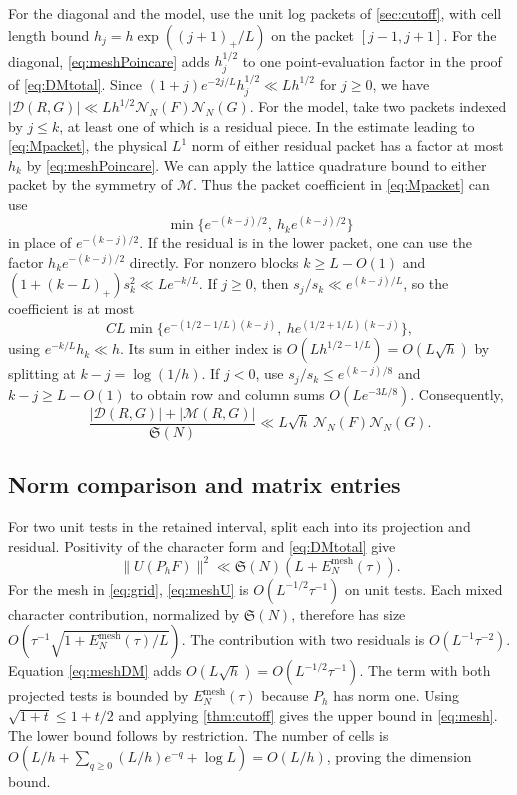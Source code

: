\documentclass[11pt,a4paper]{article}
\numberwithin{equation}{section}
\newcommand{\SSS}{\mathfrak S}
\newcommand{\NN}{\mathcal N_N}
\begin{document}
For the diagonal and the model, use the unit log packets of
\cref{sec:cutoff}, with cell length bound $h_j=h\exp((j+1)_+/L)$
on the packet $[j-1,j+1]$. For the diagonal,
\cref{eq:meshPoincare} adds $h_j^{1/2}$ to one
point-evaluation factor in the proof of \cref{eq:DMtotal}. Since
$(1+j)e^{-2j/L}h_j^{1/2}\ll Lh^{1/2}$ for $j\ge0$, we have
$|\mathcal D(R,G)|\ll Lh^{1/2}\NN(F)\NN(G)$. For the model,
take two packets indexed by $j\le k$, at least one of which is a
residual piece. In the estimate leading to \cref{eq:Mpacket},
the physical $L^1$ norm of either residual packet has a factor at most $h_k$
by \cref{eq:meshPoincare}. We can apply the lattice quadrature
bound to either packet by the symmetry of $\mathcal M$. Thus
the packet coefficient in \cref{eq:Mpacket} can use
\[
     \min\{ e^{-(k-j)/2},\ h_k e^{(k-j)/2}\}
\]
in place of $e^{-(k-j)/2}$. If the residual is in the lower packet,
one can use the factor $h_k e^{-(k-j)/2}$ directly.
For nonzero blocks $k\ge L-O(1)$ and
$(1+(k-L)_+)s_k^2\ll L e^{-k/L}$.
If $j\ge0$, then $s_j/s_k\ll e^{(k-j)/L}$, so the
coefficient is at most
\[
 C L\min\{e^{-(1/2-1/L)(k-j)},\ h e^{(1/2+1/L)(k-j)}\},
\]
using $e^{-k/L}h_k\ll h$. Its sum in either index is
$O(Lh^{1/2-1/L})=O(L\sqrt h)$ by splitting at $k-j=\log(1/h)$.
If $j<0$, use $s_j/s_k\le e^{(k-j)/8}$ and $k-j\ge L-O(1)$
to obtain row and column sums $O(L e^{-3L/8})$.
Consequently,
\begin{equation}
 \frac{|\mathcal D(R,G)|+|\mathcal M(R,G)|}{\SSS(N)}
         \ll L\sqrt h\,\NN(F)\NN(G).
 \label{eq:meshDM}
\end{equation}

\subsection{Norm comparison and matrix entries}

For two unit tests in the retained interval, split each into its
projection and residual. Positivity of the character form
and \cref{eq:DMtotal} give
\[
 \|U(P_hF)\|^2\ll\SSS(N)(L+E_N^{\mathrm{mesh}}(\tau)).
\]
For the mesh in \cref{eq:grid}, \cref{eq:meshU} is $O(L^{-1/2}\tau^{-1})$
on unit tests. Each mixed character contribution, normalized
by $\SSS(N)$, therefore has size
$O(\tau^{-1}\sqrt{1+E_N^{\mathrm{mesh}}(\tau)/L})$.
The contribution with two residuals is $O(L^{-1}\tau^{-2})$.
Equation \eqref{eq:meshDM} adds $O(L\sqrt h)=O(L^{-1/2}\tau^{-1})$.
The term with both projected tests is bounded
by $E_N^{\mathrm{mesh}}(\tau)$ because $P_h$ has norm one.
Using $\sqrt{1+t}\le1+t/2$ and applying \cref{thm:cutoff}
gives the upper bound in \cref{eq:mesh}. The lower bound follows
by restriction. The number of cells is
$O(L/h+\sum_{q\ge0}(L/h)e^{-q}+\log L)=O(L/h)$, proving the
dimension bound.
\end{document}
